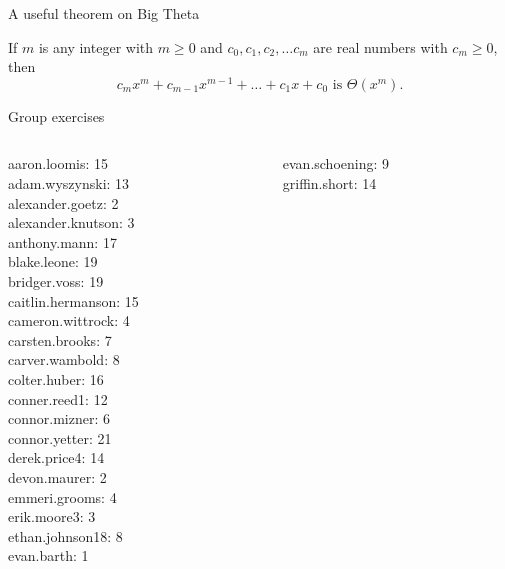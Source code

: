 \documentclass[10pt]{beamer}
\begin{document}
\begin{frame}{A useful theorem on Big Theta}

\begin{myredbox}[title=\text{Theorem: On Polynomial Orders}]
If $m$ is any integer with $m \geq 0$ and $c_0, c_1, c_2, \hdots c_m$ are real numbers with $c_m \geq 0$, then
\[c_m x^m + c_{m-1} x^{m-1} + \hdots + c_1 x + c_0 \text{ is } \Theta(x^m). \]
\end{myredbox}

\end{frame}






\begin{frame}[standout]
Group exercises
\end{frame}

\begin{frame}
\footnotesize 
\vfill 
\begin{columns}
\begin{column}{0.33\textwidth}
aaron.loomis: 15 \\ 
adam.wyszynski: 13 \\ 
alexander.goetz: 2 \\ 
alexander.knutson: 3 \\ 
anthony.mann: 17 \\ 
blake.leone: 19 \\ 
bridger.voss: 19 \\ 
caitlin.hermanson: 15 \\ 
cameron.wittrock: 4 \\ 
carsten.brooks: 7 \\ 
carver.wambold: 8 \\ 
colter.huber: 16 \\ 
conner.reed1: 12 \\ 
connor.mizner: 6 \\ 
connor.yetter: 21 \\ 
derek.price4: 14 \\ 
devon.maurer: 2 \\ 
emmeri.grooms: 4 \\ 
erik.moore3: 3 \\ 
ethan.johnson18: 8 \\ 
evan.barth: 1 \\\end{column}
\begin{column}{0.33\textwidth}
evan.schoening: 9 \\ 
griffin.short: 14 \\ 

\end{column}
\end{columns}
\end{frame}
\end{document}
